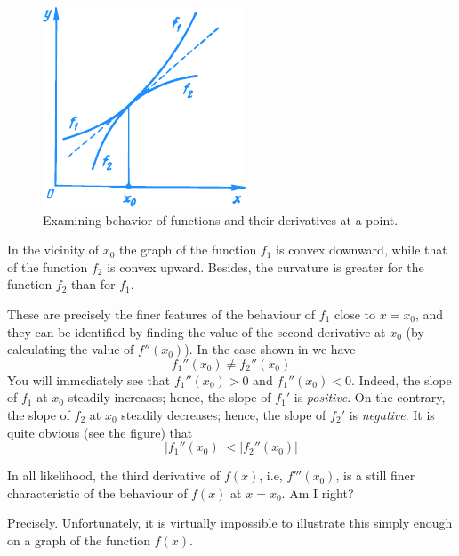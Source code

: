 \begin{figure}[!ht]%
\centering
\includegraphics[width=.6\textwidth]{figures/fig-54.pdf} 
\caption{Examining behavior of functions and their derivatives at a point.}
\label{fig-54}
\end{figure}

\rdr In the vicinity of $ x_{0}$ the graph of the function $f_{1}$ is convex downward, while that of the function $f_{2}$ is convex upward. Besides, the curvature is greater for the function $f_{2}$ than for $f_{1}$.

\athr These are precisely the finer features of the behaviour of $f_{1}$ close to $x = x_{0}$, and they can be identified by finding the value of the second derivative at $x_{0}$ (by calculating the value of $f'' (x_{0})$). In the case shown in  we have
\begin{equation*}%
f_{1}'' (x_{0}) \neq f_{2}'' (x_{0})
\end{equation*}
You will immediately see that $f_{1}'' (x_{0}) > 0$ and $ f_{1}'' (x_{0}) < 0$. Indeed, the slope of $f_{1}$ at $x_{0}$ steadily increases; hence, the slope of $f_{1}'$ is \emph{positive}. On the contrary, the slope of $f_{2}$ at $x_{0}$ steadily decreases; hence, the slope of  $f_{2}'$ is \emph{negative}. It is quite obvious (see the figure) that
\begin{equation*}%
\left| f_{1}'' (x_{0}) \right| < \left|f_{2}'' (x_{0}) \right|
\end{equation*}

\rdr In all likelihood, the third derivative of $f (x)$, i.e, $f''' (x_{0})$, is a still finer 
characteristic of the behaviour of  $f(x)$ at $x= x_{0}$. Am I right?

\athr Precisely. Unfortunately, it is virtually impossible to illustrate this simply enough on a graph of the function $f (x)$.

